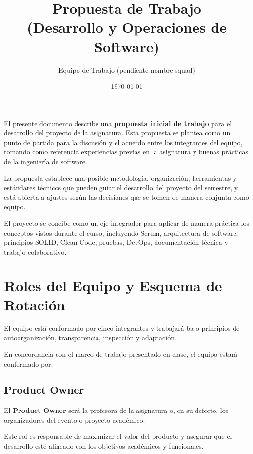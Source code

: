 \documentclass[12pt]{article}
\title{Propuesta de Trabajo \\  
(Desarrollo y Operaciones de Software)}
\author{Equipo de Trabajo (pendiente nombre squad)}
\date{\today}
\begin{document}
\maketitle
\newpage
\setcounter{tocdepth}{4}
\tableofcontents
\newpage


El presente documento describe una \textbf{propuesta inicial de trabajo} para el desarrollo del proyecto de la asignatura. Esta propuesta se plantea como un punto de partida para la discusión y el acuerdo entre los integrantes del equipo, tomando como referencia experiencias previas en la asignatura y buenas prácticas de la ingeniería de software.

La propuesta establece una posible metodología, organización, herramientas y estándares técnicos que pueden guiar el desarrollo del proyecto del semestre, y está abierta a ajustes según las decisiones que se tomen de manera conjunta como equipo.

El proyecto se concibe como un eje integrador para aplicar de manera práctica los conceptos vistos durante el curso, incluyendo Scrum, arquitectura de software, principios SOLID, Clean Code, pruebas, DevOps, documentación técnica y trabajo colaborativo.


\section{Roles del Equipo y Esquema de Rotación}

El equipo está conformado por cinco integrantes y trabajará bajo principios de autoorganización, transparencia, inspección y adaptación.

En concordancia con el marco de trabajo presentado en clase, el equipo estará conformado por:

\subsection{Product Owner}

El \textbf{Product Owner} será la profesora de la asignatura o, en su defecto, los organizadores del evento o proyecto académico.

Este rol es responsable de maximizar el valor del producto y asegurar que el desarrollo esté alineado con los objetivos académicos y funcionales.
\end{document}

